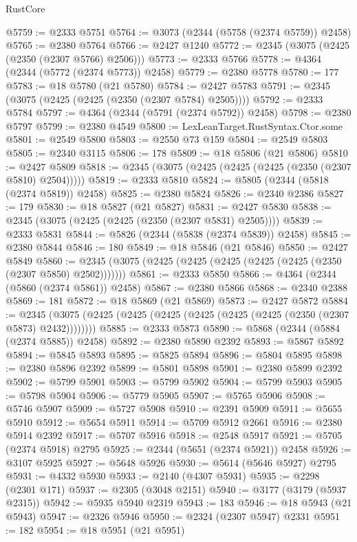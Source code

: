 \begin{lexlean}{RustCore}
\begin{coremodule}
@5759 := @2333 @5751
@5764 := @3073 (@2344 (@5758 (@2374 @5759)) @2458)
@5765 := @2380 @5764
@5766 := @2427 @1240
@5772 := @2345 (@3075 (@2425 (@2350 (@2307 @5766) @2506)))
@5773 := @2333 @5766
@5778 := @4364 (@2344 (@5772 (@2374 @5773)) @2458)
@5779 := @2380 @5778
@5780 := 177
@5783 := @18 @5780 (@21 @5780)
@5784 := @2427 @5783
@5791 := @2345 (@3075 (@2425 (@2425 (@2350 (@2307 @5784) @2505))))
@5792 := @2333 @5784
@5797 := @4364 (@2344 (@5791 (@2374 @5792)) @2458)
@5798 := @2380 @5797
@5799 := @2380 @4549
@5800 := LexLeanTarget.RustSyntax.Ctor.some
@5801 := @2549 @5800
@5803 := @2550 @73 @159
@5804 := @2549 @5803
@5805 := @2340 @3115
@5806 := 178
@5809 := @18 @5806 (@21 @5806)
@5810 := @2427 @5809
@5818 := @2345 (@3075 (@2425 (@2425 (@2425 (@2350 (@2307 @5810) @2504)))))
@5819 := @2333 @5810
@5824 := @5805 (@2344 (@5818 (@2374 @5819)) @2458)
@5825 := @2380 @5824
@5826 := @2340 @2386
@5827 := 179
@5830 := @18 @5827 (@21 @5827)
@5831 := @2427 @5830
@5838 := @2345 (@3075 (@2425 (@2425 (@2350 (@2307 @5831) @2505))))
@5839 := @2333 @5831
@5844 := @5826 (@2344 (@5838 (@2374 @5839)) @2458)
@5845 := @2380 @5844
@5846 := 180
@5849 := @18 @5846 (@21 @5846)
@5850 := @2427 @5849
@5860 := @2345 (@3075 (@2425 (@2425 (@2425 (@2425 (@2425 (@2350 (@2307 @5850) @2502)))))))
@5861 := @2333 @5850
@5866 := @4364 (@2344 (@5860 (@2374 @5861)) @2458)
@5867 := @2380 @5866
@5868 := @2340 @2388
@5869 := 181
@5872 := @18 @5869 (@21 @5869)
@5873 := @2427 @5872
@5884 := @2345 (@3075 (@2425 (@2425 (@2425 (@2425 (@2425 (@2425 (@2350 (@2307 @5873) @2432))))))))
@5885 := @2333 @5873
@5890 := @5868 (@2344 (@5884 (@2374 @5885)) @2458)
@5892 := @2380 @5890 @2392
@5893 := @5867 @5892
@5894 := @5845 @5893
@5895 := @5825 @5894
@5896 := @5804 @5895
@5898 := @2380 @5896 @2392
@5899 := @5801 @5898
@5901 := @2380 @5899 @2392
@5902 := @5799 @5901
@5903 := @5799 @5902
@5904 := @5799 @5903
@5905 := @5798 @5904
@5906 := @5779 @5905
@5907 := @5765 @5906
@5908 := @5746 @5907
@5909 := @5727 @5908
@5910 := @2391 @5909
@5911 := @5655 @5910
@5912 := @5654 @5911
@5914 := @5709 @5912 @2661
@5916 := @2380 @5914 @2392
@5917 := @5707 @5916
@5918 := @2548 @5917
@5921 := @5705 (@2374 @5918) @2795
@5925 := @2344 (@5651 (@2374 @5921)) @2458
@5926 := @3107 @5925
@5927 := @5648 @5926
@5930 := @5614 (@5646 @5927) @2795
@5931 := @4332 @5930
@5933 := @2140 (@4307 @5931)
@5935 := @2298 (@2301 @171)
@5937 := @2305 (@3048 @2151)
@5940 := @3177 (@3179 (@5937 @2315))
@5942 := @5935 @5940 @2319
@5943 := 183
@5946 := @18 @5943 (@21 @5943)
@5947 := @2326 @5946
@5950 := @2324 (@2307 @5947) @2331
@5951 := 182
@5954 := @18 @5951 (@21 @5951)

\end{coremodule}
\end{lexlean}
